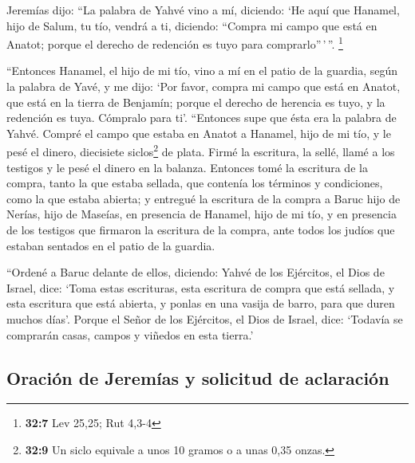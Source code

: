  Jeremías dijo: ``La palabra de Yahvé vino a mí, diciendo:
 `He aquí que Hanamel, hijo de Salum, tu tío, vendrá a ti,
diciendo: ``Compra mi campo que está en Anatot; porque el derecho de
redención es tuyo para comprarlo''\,'\,''. \footnote{\textbf{32:7} Lev
  25,25; Rut 4,3-4}

 ``Entonces Hanamel, el hijo de mi tío, vino a mí en el
patio de la guardia, según la palabra de Yavé, y me dijo: `Por favor,
compra mi campo que está en Anatot, que está en la tierra de Benjamín;
porque el derecho de herencia es tuyo, y la redención es tuya. Cómpralo
para ti'. ``Entonces supe que ésta era la palabra de Yahvé.
 Compré el campo que estaba en Anatot a Hanamel, hijo de
mi tío, y le pesé el dinero, diecisiete siclos\footnote{\textbf{32:9} Un
  siclo equivale a unos 10 gramos o a unas 0,35 onzas.} de plata.
 Firmé la escritura, la sellé, llamé a los testigos y le
pesé el dinero en la balanza.  Entonces tomé la escritura
de la compra, tanto la que estaba sellada, que contenía los términos y
condiciones, como la que estaba abierta;  y entregué la
escritura de la compra a Baruc hijo de Nerías, hijo de Maseías, en
presencia de Hanamel, hijo de mi tío, y en presencia de los testigos que
firmaron la escritura de la compra, ante todos los judíos que estaban
sentados en el patio de la guardia.

 ``Ordené a Baruc delante de ellos, diciendo:
 Yahvé de los Ejércitos, el Dios de Israel, dice: `Toma
estas escrituras, esta escritura de compra que está sellada, y esta
escritura que está abierta, y ponlas en una vasija de barro, para que
duren muchos días'.  Porque el Señor de los Ejércitos, el
Dios de Israel, dice: `Todavía se comprarán casas, campos y viñedos en
esta tierra.'

\hypertarget{oraciuxf3n-de-jeremuxedas-y-solicitud-de-aclaraciuxf3n}{%
\subsection{Oración de Jeremías y solicitud de
aclaración}\label{oraciuxf3n-de-jeremuxedas-y-solicitud-de-aclaraciuxf3n}}

